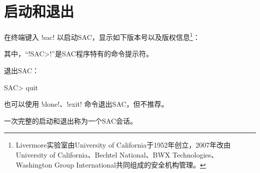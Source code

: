 \section{启动和退出}
在终端键入 !sac! 以启动SAC，显示如下版本号以及版权信息\footnote{
    Livermore实验室由University of California于1952年创立，2007年改由
    University of California、Bechtel National、BWX Technologies、
    Washington Group International共同组成的安全机构管理。}：
其中，``!SAC>!''是SAC程序特有的命令提示符。

退出SAC：
\begin{SACCode}
SAC> quit
\end{SACCode}
也可以使用 !done!、!exit! 命令退出SAC，但不推荐。

一次完整的启动和退出称为一个SAC会话。
